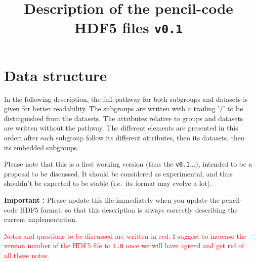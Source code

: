\documentclass[a4paper,12pt]{article}
\title{Description of the pencil-code HDF5 files \texttt{v0.1}}
\author{}
\newcommand{\note}[1]{\textcolor{red}{#1}}
\begin{document}
\maketitle
\thispagestyle{empty}



\section{Data structure}
\label{sec:data-structure}

In the following description, the full pathway for both subgroups and
datasets is given for better readability. The subgroups are written
with a trailing '$\slash$' to be distinguished from the datasets. The
attributes relative to groups and datasets are written without the
pathway. The different elements are presented in this order: after
each subgroup follow its different attributes, then its datasets,
then its embedded subgroups.


Please note that this is a first working version (thus the
\texttt{v0.1}...), intended to be a proposal to be discussed. It
should be considered as experimental, and thus shouldn't be expected
to be stable (i.e.\  its format may evolve a lot).


\textbf{Important :} Please update this file immediately when you
update the pencil-code HDF5 format, so that this description is always
correctly describing the current implementation.

\note{Notes and questions to be discussed are written in red. I
  suggest to increase the version number of the HDF5 file to
  \texttt{1.0} once we will have agreed and get rid of all these
  notes.}
\end{document}
